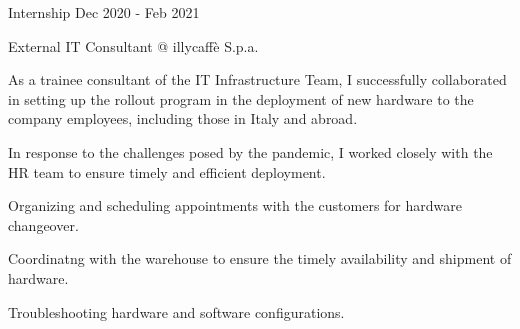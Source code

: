 \begin{cventries}
  \cventry
    {Internship} %
    {} %
    {} %
    {Dec 2020 - Feb 2021 } %
    {
      \begin{cvitems} %
        \item {External IT Consultant @ illycaffè S.p.a.}
        \item {As a trainee consultant of the IT Infrastructure Team, I successfully collaborated in
        setting up the rollout program in the deployment of new hardware to the company
        employees, including those in Italy and abroad.}
        \item {In response to the challenges posed by the pandemic, I worked closely with the HR team
        to ensure timely and efficient deployment.}
        \item {Organizing and scheduling appointments with the customers for hardware
        changeover.}
        \item {Coordinatng with the warehouse to ensure the timely availability and shipment
        of hardware.}
        \item {Troubleshooting hardware and software configurations.}
      \end{cvitems}
    }

\end{cventries}
